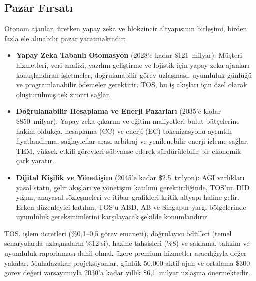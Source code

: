 \documentclass[11pt]{article}
\begin{document}
\subsection{Pazar Fırsatı}
Otonom ajanlar, üretken yapay zeka ve blokzincir altyapısının birleşimi, birden fazla ele alınabilir pazar yaratmaktadır:
\begin{itemize}[noitemsep]
  \item \textbf{Yapay Zeka Tabanlı Otomasyon} (2028'e kadar \$121~milyar): Müşteri hizmetleri, veri analizi, yazılım geliştirme ve lojistik için yapay zeka ajanları konuşlandıran işletmeler, doğrulanabilir görev uzlaşması, uyumluluk günlüğü ve programlanabilir ödemeler gerektirir. TOS, bu iş akışları için özel olarak oluşturulmuş tek zinciri sağlar.
  \item \textbf{Doğrulanabilir Hesaplama ve Enerji Pazarları} (2035'e kadar \$850~milyar): Yapay zeka çıkarım ve eğitim maliyetleri bulut bütçelerine hakim oldukça, hesaplama (CC) ve enerji (EC) tokenizasyonu ayrıntılı fiyatlandırma, sağlayıcılar arası arbitraj ve yenilenebilir enerji izleme sağlar. TEM, yüksek etkili görevleri sübvanse ederek sürdürülebilir bir ekonomik çark yaratır.
  \item \textbf{Dijital Kişilik ve Yönetişim} (2045'e kadar \$2,5~trilyon): AGI varlıkları yasal statü, gelir akışları ve yönetişim katılımı gerektirdiğinde, TOS'un DID yığını, anayasal sözleşmeleri ve itibar grafikleri kritik altyapı haline gelir. Erken düzenleyici katılım, TOS'u ABD, AB ve Singapur yargı bölgelerinde uyumluluk gereksinimlerini karşılayacak şekilde konumlandırır.
\end{itemize}

TOS, işlem ücretleri (\%0,1--0,5 görev emaneti), doğrulayıcı ödülleri (temel senaryolarda uzlaşmaların \%12'si), hazine tahsisleri (\%8) ve saklama, tahkim ve uyumluluk raporlaması dahil olmak üzere premium hizmetler aracılığıyla değer yakalar. Muhafazakar projeksiyonlar, günlük 50.000 aktif ajan ve ortalama \$300 görev değeri varsayımıyla 2030'a kadar yıllık \$6,1~milyar uzlaşma önermektedir.
\end{document}
